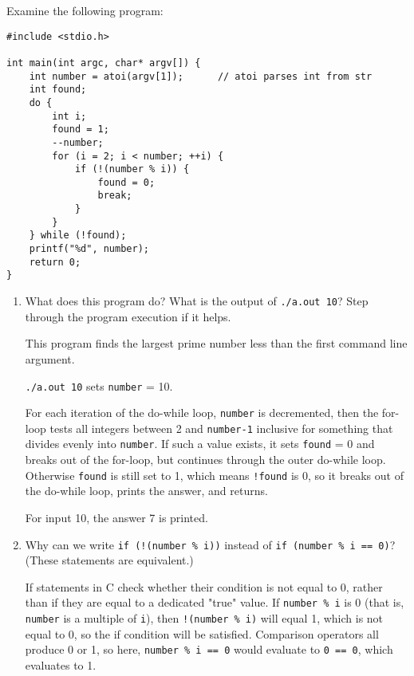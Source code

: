 Examine the following program:

\begin{verbatim}
#include <stdio.h>

int main(int argc, char* argv[]) {
    int number = atoi(argv[1]);      // atoi parses int from str
    int found;
    do {
        int i;
        found = 1;
        --number;
        for (i = 2; i < number; ++i) {
            if (!(number % i)) {
                found = 0;
                break;
            }
        }
    } while (!found);
    printf("%d", number);
    return 0;
}
\end{verbatim}

\begin{enumerate}

\item What does this program do? What is the output of \texttt{./a.out 10}? Step through the program execution if it helps.

\begin{answer}
This program finds the largest prime number less than the first command line argument.

\texttt{./a.out 10} sets \texttt{number} = 10.

For each iteration of the do-while loop, \texttt{number} is decremented,
then the for-loop tests all integers between 2 and \texttt{number-1} inclusive for something that divides evenly into \texttt{number}.
If such a value exists, it sets \texttt{found} = 0 and breaks out of the for-loop, but continues through the outer do-while loop.
Otherwise \texttt{found} is still set to 1, which means \texttt{!found} is 0, so it breaks out of the do-while loop, prints the answer, and returns.

For input 10, the answer 7 is printed.
\end{answer}



\item Why can we write \texttt{if (!(number \% i))} instead of \texttt{if (number \% i == 0)}? (These statements are equivalent.)

\begin{answer}
If statements in C check whether their condition is not equal to 0, rather than if they are equal to a dedicated "true" value. If \texttt{number \% i} is 0 (that is, \texttt{number} is a multiple of \texttt{i}), then \texttt{!(number \% i)} will equal 1, which is not equal to 0, so the if condition will be satisfied. Comparison operators all produce 0 or 1, so here, \texttt{number \% i == 0} would evaluate to \texttt{0 == 0}, which evaluates to 1.
\end{answer}



\end{enumerate}
